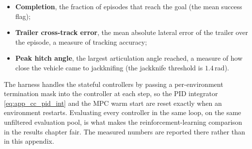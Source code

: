 \begin{itemize}
    \item \textbf{Completion}, the fraction of episodes that reach the goal
    (the mean success flag);
    \item \textbf{Trailer cross-track error}, the mean absolute lateral error of the
    trailer over the episode, a measure of tracking accuracy;
    \item \textbf{Peak hitch angle}, the largest articulation angle reached, a measure
    of how close the vehicle came to jackknifing (the jackknife threshold is
    $1.4$\,rad).
\end{itemize}

The harness handles the stateful controllers by passing a per-environment termination mask
into the controller at each step, so the PID integrator \eqref{eq:app_cc_pid_int} and the
MPC warm start are reset exactly when an environment restarts. Evaluating every controller
in the same loop, on the same unfiltered evaluation pool, is what makes the reinforcement-learning
comparison in the results chapter fair. The measured numbers are
reported there rather than in this appendix.
